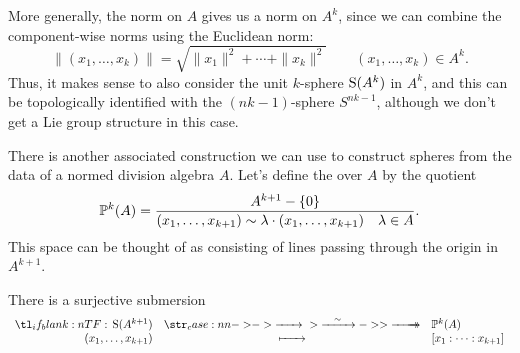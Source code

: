 More generally, the norm on $A$ gives us a norm on $A^k$, since we can combine the component-wise norms using the Euclidean norm:
\[
  \|(x_1, \ldots, x_k)\| = \sqrt{\|x_1\|^2+\cdots+\|x_k\|^2}\quad\quad (x_1,\ldots,x_k)\in A^k.
\]
Thus, it makes sense to also consider the unit $k$-sphere $\S(A^k)$ in $A^k$, and this can be topologically identified with the $(nk-1)$-sphere $S^{nk-1}$, although we don't get a Lie group structure in this case.

There is another associated construction we can use to construct spheres from the data of a normed division algebra $A$. Let's define the  over $A$ by the quotient
\[
  \P^k(A) = \frac{A^{k+1} -\{0\}}{(x_1,\ldots, x_{k+1})\sim \lambda \cdot (x_1,\ldots, x_{k+1})\quad \lambda\in A}.
\]
This space can be thought of as consisting of lines passing through the origin in $A^{k+1}$. 

There is a surjective submersion
\[
  \lkxfunc{}{\S(A^{k+1})}{\P^{k}(A)}{(x_1,\ldots, x_{k+1})}{[x_1 : \cdots : x_{k+1}]}
\]

